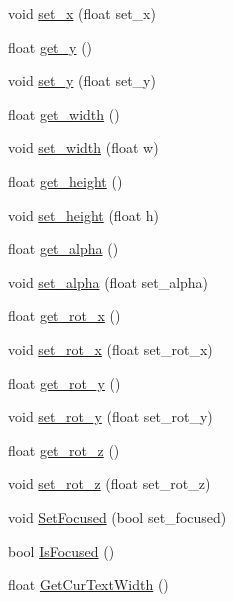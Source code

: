 \begin{DoxyCompactItemize}
void \hyperlink{class_n_g_u_i_pager_ae53a6ed7efb9627b14a0e0657756203d}{set\+\_\+x} (float set\+\_\+x)
\item 
float \hyperlink{class_n_g_u_i_pager_a477213e9b2fdfd21b40a0cd82404b1eb}{get\+\_\+y} ()
\item 
void \hyperlink{class_n_g_u_i_pager_a549c2d0ef033bffc93cefd6da82373d7}{set\+\_\+y} (float set\+\_\+y)
\item 
float \hyperlink{class_n_g_u_i_pager_a759486a9acfb4c874b029a6a643ef9dd}{get\+\_\+width} ()
\item 
void \hyperlink{class_n_g_u_i_pager_a944ee3b9bf2748f434387f177745521b}{set\+\_\+width} (float w)
\item 
float \hyperlink{class_n_g_u_i_pager_a5fc8a208dd78934d8355a64c4102b40e}{get\+\_\+height} ()
\item 
void \hyperlink{class_n_g_u_i_pager_a69a7de01a15cbed881e178771b77a7b0}{set\+\_\+height} (float h)
\item 
float \hyperlink{class_n_g_u_i_pager_a15c892c9cef9ef1f0e15b6c68253cc22}{get\+\_\+alpha} ()
\item 
void \hyperlink{class_n_g_u_i_pager_ab7273128c03dd292f8e647f65d8d882b}{set\+\_\+alpha} (float set\+\_\+alpha)
\item 
float \hyperlink{class_n_g_u_i_pager_a581e6a8aa26176540d12549cd87a44c3}{get\+\_\+rot\+\_\+x} ()
\item 
void \hyperlink{class_n_g_u_i_pager_afb4280f12343e8f6b5942328a1e03489}{set\+\_\+rot\+\_\+x} (float set\+\_\+rot\+\_\+x)
\item 
float \hyperlink{class_n_g_u_i_pager_acd8b3a81ac2c8cd8324d6c132734edc1}{get\+\_\+rot\+\_\+y} ()
\item 
void \hyperlink{class_n_g_u_i_pager_adeac17cfc05c331ebc844bbac91245cc}{set\+\_\+rot\+\_\+y} (float set\+\_\+rot\+\_\+y)
\item 
float \hyperlink{class_n_g_u_i_pager_ad72cc4b0e6885a91350452e13f65ae19}{get\+\_\+rot\+\_\+z} ()
\item 
void \hyperlink{class_n_g_u_i_pager_a5adc12311ecd1f37510419b6e2bdd6b5}{set\+\_\+rot\+\_\+z} (float set\+\_\+rot\+\_\+z)
\item 
void \hyperlink{class_n_g_u_i_pager_ab2f05ba0b7444f33beaf92d283229c4c}{Set\+Focused} (bool set\+\_\+focused)
\item 
bool \hyperlink{class_n_g_u_i_pager_ab1090dd9d358a4b31b27b4dc3c8f0c97}{Is\+Focused} ()
\item 
float \hyperlink{class_n_g_u_i_pager_aa99dc72f644a4439b60e498426a133c5}{Get\+Cur\+Text\+Width} ()

\end{DoxyCompactItemize}

